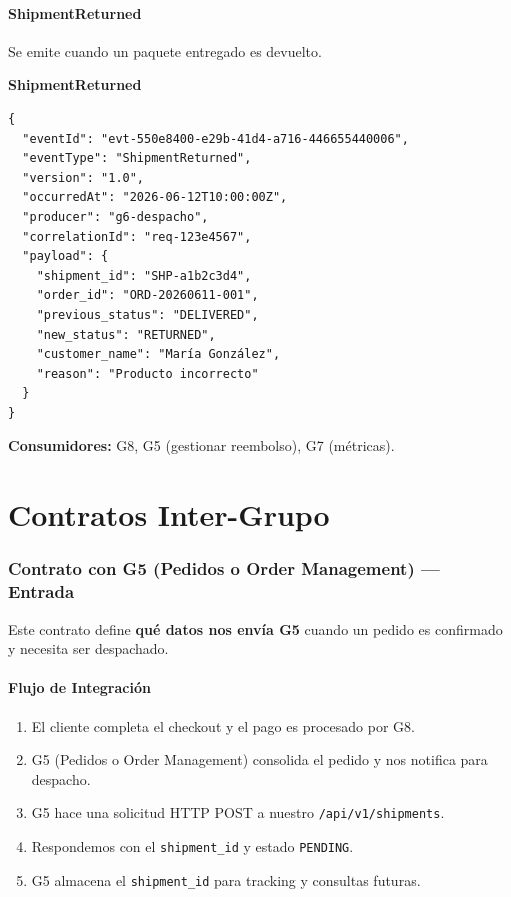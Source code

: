 \documentclass[11pt, a4paper]{article}
\newcommand{\contractheader}[1]{%
  \noindent\colorbox{primary!10}{%
    \parbox{\dimexpr\textwidth-2\fboxsep}{%
      \textbf{\faFileCode\quad #1}%
    }%
  }
  \vspace{0.3cm}
}
\begin{document}
\subsection{ShipmentReturned}

Se emite cuando un paquete entregado es devuelto.

\contractheader{ShipmentReturned}

\begin{lstlisting}
{
  "eventId": "evt-550e8400-e29b-41d4-a716-446655440006",
  "eventType": "ShipmentReturned",
  "version": "1.0",
  "occurredAt": "2026-06-12T10:00:00Z",
  "producer": "g6-despacho",
  "correlationId": "req-123e4567",
  "payload": {
    "shipment_id": "SHP-a1b2c3d4",
    "order_id": "ORD-20260611-001",
    "previous_status": "DELIVERED",
    "new_status": "RETURNED",
    "customer_name": "María González",
    "reason": "Producto incorrecto"
  }
}
\end{lstlisting}

\textbf{Consumidores:} G8, G5 (gestionar reembolso), G7 (métricas).


\newpage
\part{Contratos Inter-Grupo}

\section{Contrato con G5 (Pedidos o Order Management) --- Entrada}
\label{sec:contrato-g5}

Este contrato define \textbf{qué datos nos envía G5} cuando un pedido es
confirmado y necesita ser despachado.

\subsection{Flujo de Integración}

\begin{enumerate}[noitemsep]
  \item El cliente completa el checkout y el pago es procesado por G8.
  \item G5 (Pedidos o Order Management) consolida el pedido y nos notifica para despacho.
  \item G5 hace una solicitud HTTP POST a nuestro \texttt{/api/v1/shipments}.
  \item Respondemos con el \texttt{shipment\_id} y estado \texttt{PENDING}.
  \item G5 almacena el \texttt{shipment\_id} para tracking y consultas futuras.
\end{enumerate}
\end{document}

